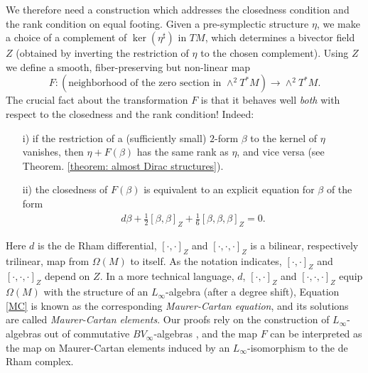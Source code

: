 \documentclass[11pt,thmsa]{amsart}
\theoremstyle{definition}
\begin{document}
We therefore need a construction which addresses the closedness condition and the rank condition on equal footing. Given a pre-symplectic structure $\eta$, 
we make a choice of a complement of $\ker(\eta^\sharp)$ in $TM$, which determines
 a bivector field $Z$ (obtained by inverting the restriction of $\eta$  to the chosen complement). Using $Z$ we define a smooth, fiber-preserving but non-linear map
 $$F\colon (\text{neighborhood of the zero section in $\wedge^2 T^*M$}) \to   \wedge^2 T^*M.$$
The crucial fact about the transformation $F$ 
is that it 
 behaves well {\em both} with respect to the closedness and the rank condition!
Indeed:
\begin{itemize}
\item[i)] 
if the restriction of a (sufficiently small) 
$2$-form $\beta$ to the kernel of $\eta$ vanishes, then
$\eta + F(\beta)$ has the same rank as $\eta$, and vice versa {(see Theorem. \ref{theorem: almost Dirac structures})}.
\item[ii)]
the closedness of $F(\beta)$ is equivalent to  
an explicit equation for $\beta$ of the form
\begin{align}\label{MC} d\beta + \frac{1}{2}[\beta,\beta]_Z+ \frac{1}{6}[\beta,\beta,\beta]_Z =0.
\end{align}
\end{itemize}
Here $d$ is the de Rham differential, $[\cdot,\cdot]_Z$ and $[\cdot,\cdot,\cdot]_Z$ is a bilinear, respectively trilinear, map from $\Omega(M)$ to itself.
As the notation indicates, $[\cdot,\cdot]_Z$
and $[\cdot,\cdot,\cdot]_Z$ depend on $Z$.
In a more technical language, $d$, $[\cdot,\cdot]_Z$ and $[\cdot,\cdot,\cdot]_Z$
equip $\Omega(M)$ with the structure of an $L_\infty$-algebra (after a degree shift), Equation \eqref{MC}
is known as the corresponding {\em Maurer-Cartan equation}, and its solutions are called {\em Maurer-Cartan elements}. Our proofs rely on the construction of $L_{\infty}$-algebras out of commutative $BV_{\infty}$-algebras \cite{Koszul,Kravchenko}, and the map $F$ can be interpreted as the map on Maurer-Cartan elements induced by an $L_{\infty}$-isomorphism to the de Rham complex.
\end{document}

